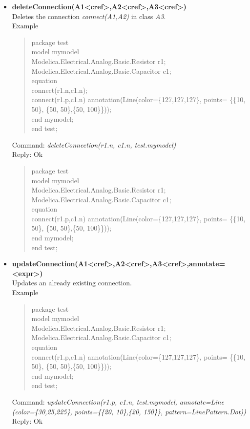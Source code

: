 \documentclass[11pt,a4paper,oneside,english]{book}
\newenvironment{modelicaExamples}{\begin{itemize}}{\end{itemize}}
\newcommand{\api}[2]{\item \textbf{#1} \\ #2}
\newcommand{\tab}{\hspace{2em}}
\newcommand{\command}[1]{Command: \textit{#1}\\}
\newcommand{\reply}[1]{Reply: #1}
\newcommand{\functionex}[2]{\begin{singlespace} \command{#1} \reply{#2} \end{singlespace}}
\newcommand{\examples}{Example}
\newenvironment{mocode}{\begin{verse}\begin{singlespace}\begin{scriptsize}\ttfamily}{\end{scriptsize}\end{singlespace}\end{verse}}
\begin{document}
\begin{modelicaExamples}
		\api{deleteConnection(A1<cref>,A2<cref>,A3<cref>)}{Deletes the connection \textit{connect(A1,A2)} in class \textit{A3}.\\
		\examples
		\begin{mocode}
		package test\\
		\tab model mymodel\\
		\tab\tab Modelica.Electrical.Analog.Basic.Resistor r1;\\
		\tab\tab Modelica.Electrical.Analog.Basic.Capacitor c1;\\
		\tab equation \\
		\tab\tab connect(r1.n,c1.n);\\
		\tab\tab connect(r1.p,c1.n) annotation(Line(color=\{127,127,127\}, po\-ints= \{\{10, 50\}, \{50, 50\},\{50, 100\}\}));\\
		\tab end mymodel;\\
		end test;\\
		\end{mocode}
		\functionex{deleteConnection(r1.n, c1.n, test.mymodel)}
		{Ok}

		\begin{mocode}
		package test\\
		\tab model mymodel\\
		\tab\tab Modelica.Electrical.Analog.Basic.Resistor r1;\\
		\tab\tab Modelica.Electrical.Analog.Basic.Capacitor c1;\\
		\tab equation \\
		\tab\tab connect(r1.p,c1.n) annotation(Line(color=\{127,127,127\}, po\-ints= \{\{10, 50\}, \{50, 50\},\{50, 100\}\}));\\
		\tab end mymodel;\\
		end test;\\
		\end{mocode}
		}

		\api{updateConnection(A1<cref>,A2<cref>,A3<cref>,annotate=<expr>)}{Updates an already existing connection.\\
		\examples
		\begin{mocode}
		package test\\
		\tab model mymodel\\
		\tab\tab Modelica.Electrical.Analog.Basic.Resistor r1;\\
		\tab\tab Modelica.Electrical.Analog.Basic.Capacitor c1;\\
		\tab equation \\
		\tab\tab connect(r1.p,c1.n) annotation(Line(color=\{127,127,127\}, po\-ints= \{\{10, 50\}, \{50, 50\},\{50, 100\}\}));\\
		\tab end mymodel;\\
		end test;\\
		\end{mocode}
		\functionex{updateConnection(r1.p, c1.n, test.mymodel, annotate=Line (co\-lor=\{30,25,225\}, points=\{\{20, 10\},\{20, 150\}\}, pattern=LinePattern.Dot))}
		{Ok}

}
\end{modelicaExamples}
\end{document}
